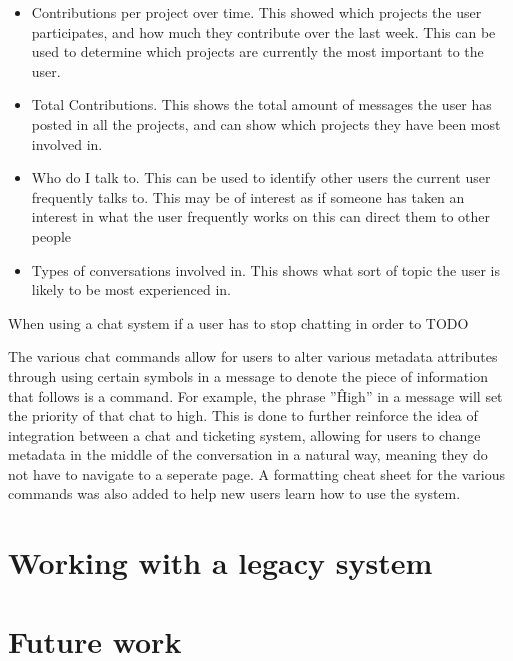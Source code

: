 \documentclass{l4proj}
\begin{document}
\begin{itemize}
\item Contributions per project over time.  This showed which projects the user participates, and how much they contribute over the last week.  This can be used to determine which projects are currently the most important to the user.
\item Total Contributions.  This shows the total amount of messages the user has posted in all the projects, and can show which projects they have been most involved in.
\item Who do I talk to.  This can be used to identify other users the current user frequently talks to.  This may be of interest as if someone has taken an interest in what the user frequently works on this can direct them to other people
\item Types of conversations involved in.  This shows what sort of topic the user is likely to be most experienced in. 
\end{itemize}

When using a chat system if a user has to stop chatting in order to TODO

The various chat commands allow for users to alter various metadata attributes through using certain symbols in a message to denote the piece of information that follows is a command.  For example, the phrase ''\^High'' in a message will set the priority of that chat to high.  This is done to further reinforce the idea of integration between a chat and ticketing system, allowing for users to change metadata in the middle of the conversation in a natural way, meaning they do not have to navigate to a seperate page.  A formatting cheat sheet for the various commands was also added to help new users learn how to use the system.


\chapter{Working with a legacy system}
\chapter{Future work}




\begin{appendices}


\end{appendices}




\end{document}
